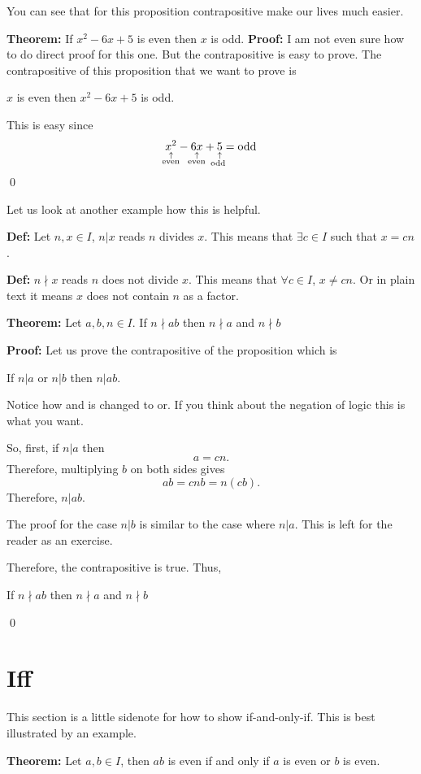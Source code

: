 \documentclass[a4paper, 12pt]{article}
\newcommand{\definition}{\noindent\textbf{Def:} }
\newcommand{\theorem}{\noindent\textbf{Theorem:} }
\renewcommand{\proof}{\noindent\textbf{Proof:} }
\newcommand{\qedd}{\qed\newline}
\newcommand{\expl}[2]{%
	\underset{\substack{\uparrow\\\mathrlap{\text{\hspace{-1em}#2}}}}{#1}}
\theoremstyle{examplestyle}
\begin{document}
\begin{multicols}{2}
You can see that for this proposition contrapositive make our lives much easier.

\theorem If $x^2-6x+5$ is even then $x$ is odd.
\proof I am not even sure how to do direct proof for this one. But the contrapositive is easy to prove. The contrapositive of this proposition that we want to prove is
\begin{center}
	$x$ is even then $x^2-6x+5$ is odd.
\end{center}
This is easy since
\[
	\expl{x^2}{\text{even}} - \expl{6x}{\text{even}} + \expl{5}{\text{odd}} = \text{odd}
\]
\qedd

Let us look at another example how this is helpful.

\definition Let $n,x \in I$, $n | x$ reads $n$ divides $x$. This means that $\exists c\in I$ such that $x = cn$.

\definition $n \nmid x$ reads $n$ does not divide $x$. This means that $\forall c \in I$, $x \ne cn$. Or in plain text it means $x$ does not contain $n$ as a factor.

\theorem Let $a,b,n \in I$.  If $ n \nmid ab$ then $n\nmid a$ and $n \nmid b$

\proof Let us prove the contrapositive of the proposition which is
\begin{center}
	If $n | a$ or $n | b$ then $n | ab$.
\end{center}

Notice how and is changed to or. If you think about the negation of logic this is what you want.

So, first, if $n|a$ then
\[ a = cn. \]
Therefore, multiplying $b$ on both sides gives
\[
	ab = cnb = n(cb).
\]
Therefore, $n | ab$.

The proof for the case $n|b$ is similar to the case where $n|a$. This is left for the reader as an exercise.

Therefore, the contrapositive is true. Thus,
\begin{center}
If $ n \nmid ab$ then $n\nmid a$ and $n \nmid b$
\end{center}
\qed
\section*{Iff}

This section is a little sidenote for how to show if-and-only-if. This is best illustrated by an example.

\theorem Let $a,b \in I$, then $ab$ is even if and only if $a$ is even or $b$ is even.


\end{multicols}
\end{document}
